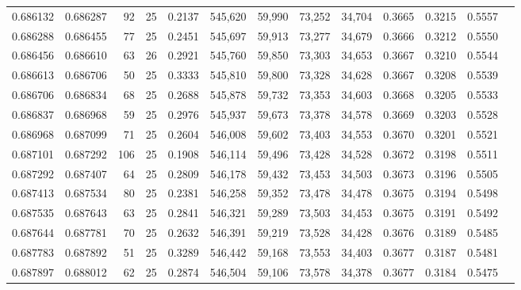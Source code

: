 \begin{tabular}{rrrrrrrrrrrrr}
0.686132 & 0.686287 &    92 &  25 &                                     0.2137 & 545,620 &  59,990 &  73,252 &  34,704 & 0.3665 & 0.3215 & 0.5557 \\
0.686288 & 0.686455 &    77 &  25 &                                     0.2451 & 545,697 &  59,913 &  73,277 &  34,679 & 0.3666 & 0.3212 & 0.5550 \\
0.686456 & 0.686610 &    63 &  26 &                                     0.2921 & 545,760 &  59,850 &  73,303 &  34,653 & 0.3667 & 0.3210 & 0.5544 \\
0.686613 & 0.686706 &    50 &  25 &                                     0.3333 & 545,810 &  59,800 &  73,328 &  34,628 & 0.3667 & 0.3208 & 0.5539 \\
0.686706 & 0.686834 &    68 &  25 &                                     0.2688 & 545,878 &  59,732 &  73,353 &  34,603 & 0.3668 & 0.3205 & 0.5533 \\
0.686837 & 0.686968 &    59 &  25 &                                     0.2976 & 545,937 &  59,673 &  73,378 &  34,578 & 0.3669 & 0.3203 & 0.5528 \\
0.686968 & 0.687099 &    71 &  25 &                                     0.2604 & 546,008 &  59,602 &  73,403 &  34,553 & 0.3670 & 0.3201 & 0.5521 \\
0.687101 & 0.687292 &   106 &  25 &                                     0.1908 & 546,114 &  59,496 &  73,428 &  34,528 & 0.3672 & 0.3198 & 0.5511 \\
0.687292 & 0.687407 &    64 &  25 &                                     0.2809 & 546,178 &  59,432 &  73,453 &  34,503 & 0.3673 & 0.3196 & 0.5505 \\
0.687413 & 0.687534 &    80 &  25 &                                     0.2381 & 546,258 &  59,352 &  73,478 &  34,478 & 0.3675 & 0.3194 & 0.5498 \\
0.687535 & 0.687643 &    63 &  25 &                                     0.2841 & 546,321 &  59,289 &  73,503 &  34,453 & 0.3675 & 0.3191 & 0.5492 \\
0.687644 & 0.687781 &    70 &  25 &                                     0.2632 & 546,391 &  59,219 &  73,528 &  34,428 & 0.3676 & 0.3189 & 0.5485 \\
0.687783 & 0.687892 &    51 &  25 &                                     0.3289 & 546,442 &  59,168 &  73,553 &  34,403 & 0.3677 & 0.3187 & 0.5481 \\
0.687897 & 0.688012 &    62 &  25 &                                     0.2874 & 546,504 &  59,106 &  73,578 &  34,378 & 0.3677 & 0.3184 & 0.5475 \\

\end{tabular}
